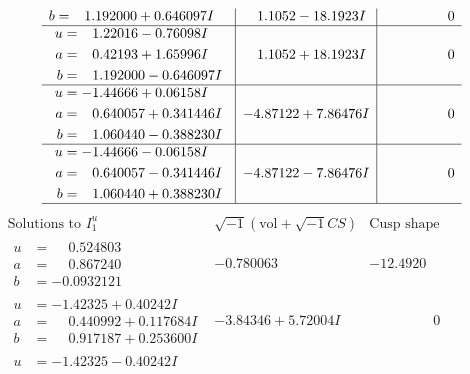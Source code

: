 \documentclass[1p]{elsarticle_modified}
\theoremstyle{definition}
\newcommand{\I}{\sqrt{-1}}
\begin{document}
$$\begin{array}{c|c|c}
\begin{aligned}
b &= \phantom{-}1.192000 + 0.646097 I\end{aligned}
 & \phantom{-}1.1052 - 18.1923 I & \phantom{-0.000000 } 0 \\ \hline\begin{aligned}
u &= \phantom{-}1.22016 - 0.76098 I \\
a &= \phantom{-}0.42193 + 1.65996 I \\
b &= \phantom{-}1.192000 - 0.646097 I\end{aligned}
 & \phantom{-}1.1052 + 18.1923 I & \phantom{-0.000000 } 0 \\ \hline\begin{aligned}
u &= -1.44666 + 0.06158 I \\
a &= \phantom{-}0.640057 + 0.341446 I \\
b &= \phantom{-}1.060440 - 0.388230 I\end{aligned}
 & -4.87122 + 7.86476 I & \phantom{-0.000000 } 0 \\ \hline\begin{aligned}
u &= -1.44666 - 0.06158 I \\
a &= \phantom{-}0.640057 - 0.341446 I \\
b &= \phantom{-}1.060440 + 0.388230 I\end{aligned}
 & -4.87122 - 7.86476 I & \phantom{-0.000000 } 0\\
 \hline 
 \end{array}$$\newpage$$\begin{array}{c|c|c}  
\text{Solutions to }I^u_{1}& \I (\text{vol} + \sqrt{-1}CS) & \text{Cusp shape}\\
 \hline 
\begin{aligned}
u &= \phantom{-}0.524803\phantom{ +0.000000I} \\
a &= \phantom{-}0.867240\phantom{ +0.000000I} \\
b &= -0.0932121\phantom{ +0.000000I}\end{aligned}
 & -0.780063\phantom{ +0.000000I} & -12.4920\phantom{ +0.000000I} \\ \hline\begin{aligned}
u &= -1.42325 + 0.40242 I \\
a &= \phantom{-}0.440992 + 0.117684 I \\
b &= \phantom{-}0.917187 + 0.253600 I\end{aligned}
 & -3.84346 + 5.72004 I & \phantom{-0.000000 } 0 \\ \hline\begin{aligned}
u &= -1.42325 - 0.40242 I \\

\end{aligned}
\end{array}$$
\end{document}
